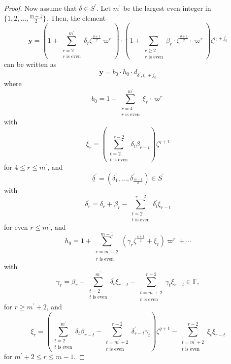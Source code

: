 \documentclass[12pt]{amsart}
\theoremstyle{definition}
\theoremstyle{remark}
\begin{document}
\begin{proof}
Now assume that $\underline{\delta} \in S^\prime$. Let $m^\prime$ be the largest even integer in $\{1,2,\dots,\frac{m-1}{2} \}$. Then, the element 
\[\textbf{y} = \left(1 + \sum\limits_{\substack{r = 2  \\    r \text{ is even} }}^{m^\prime} \delta_r \zeta^{\frac{q+1}{2}} \varpi^r \right) \cdot \left(1 + \sum\limits_{\substack{r \geq 2  \\    r \text{ is even} }}\beta_r \cdot  \zeta^{\frac{q+1}{2}} \cdot \varpi^r \right) \zeta^{i_0 + j_0}\]
can be written as 
\[\textbf{y}= b_0 \cdot h_0 \cdot d_{\underline{\delta}^\prime, i_0 + j_0}\] 
where
\[b_0 =  1 + \sum\limits_{\substack{r = 4  \\    r \text{ is even} }}^{m^\prime} \xi_r  \cdot \varpi^r \] 
with
\[\xi_r = \left(\sum\limits_{\substack{ t = 2  \\    t \text{ is even} }}^{r-2} \delta_t \beta_{r-t} \right) \zeta^{q+1} \]
for $4 \leq r \leq m^\prime$, and
\[\underline{\delta}^\prime = (\delta_1^\prime,...,\delta_{\frac{m-1}{2}}^\prime) \in S^\prime\]
with
\[
\delta_r^\prime = \delta_r + \beta_r - \sum\limits_{\substack{t = 2  \\    t \text{ is even} }}^{r-2} \delta_t^\prime \xi_{r-t} 
\]
for even $r \leq m^\prime$, and
\[h_0 = 1 + \sum\limits_{\substack{r = m^\prime + 2  \\    r \text{ is even}}}^{m-1} (\gamma_r \zeta^{\frac{q+1}{2}} + \xi_r)\varpi^r +\cdots \]
with
\[\gamma_r = \beta_r - \sum\limits_{\substack{ t = 2  \\    t \text{ is even} }}^{m^\prime} \delta_t^\prime \xi_{r-t} - \sum\limits_{\substack{ t =m^\prime +2  \\    t \text{ is even} }}^{r-2} \gamma_t \xi_{r-t}  \in \mathbb F,\]
for $r \geq m^\prime+2$, and
\[\xi_r = \left(\sum\limits_{\substack{ t = 2  \\    t \text{ is even} }}^{m^\prime} \delta_t \beta_{r-t} - \sum\limits_{\substack{ t = m^\prime+2  \\    t \text{ is even} }}^{r-2} \delta_{r-t}^\prime \gamma_t \right)\zeta^{q+1} 
- \sum\limits_{\substack{ t = m^\prime+2  \\    t \text{ is even} }}^{r-2} \xi_t \xi_{r-t} \]
for $m^\prime+2 \leq r \leq m-1$. 


\end{proof}
\end{document}
